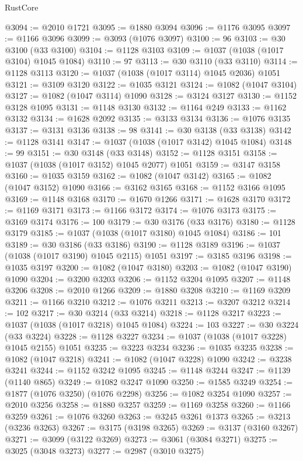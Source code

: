 \begin{lexlean}{RustCore}
\begin{coremodule}
@3094 := @2010 @1721
@3095 := @1880 @3094
@3096 := @1176 @3095
@3097 := @1166 @3096
@3099 := @3093 (@1076 @3097)
@3100 := 96
@3103 := @30 @3100 (@33 @3100)
@3104 := @1128 @3103
@3109 := @1037 (@1038 (@1017 @3104) @1045 @1084)
@3110 := 97
@3113 := @30 @3110 (@33 @3110)
@3114 := @1128 @3113
@3120 := @1037 (@1038 (@1017 @3114) @1045 @2036) @1051
@3121 := @3109 @3120
@3122 := @1035 @3121
@3124 := @1082 (@1047 @3104)
@3127 := @1082 (@1047 @3114) @1090
@3128 := @3124 @3127
@3130 := @1152 @3128 @1095
@3131 := @1148 @3130
@3132 := @1164 @249
@3133 := @1162 @3132
@3134 := @1628 @2092
@3135 := @3133 @3134
@3136 := @1076 @3135
@3137 := @3131 @3136
@3138 := 98
@3141 := @30 @3138 (@33 @3138)
@3142 := @1128 @3141
@3147 := @1037 (@1038 (@1017 @3142) @1045 @1084)
@3148 := 99
@3151 := @30 @3148 (@33 @3148)
@3152 := @1128 @3151
@3158 := @1037 (@1038 (@1017 @3152) @1045 @2077) @1051
@3159 := @3147 @3158
@3160 := @1035 @3159
@3162 := @1082 (@1047 @3142)
@3165 := @1082 (@1047 @3152) @1090
@3166 := @3162 @3165
@3168 := @1152 @3166 @1095
@3169 := @1148 @3168
@3170 := @1670 @1266
@3171 := @1628 @3170
@3172 := @1169 @3171
@3173 := @1166 @3172
@3174 := @1076 @3173
@3175 := @3169 @3174
@3176 := 100
@3179 := @30 @3176 (@33 @3176)
@3180 := @1128 @3179
@3185 := @1037 (@1038 (@1017 @3180) @1045 @1084)
@3186 := 101
@3189 := @30 @3186 (@33 @3186)
@3190 := @1128 @3189
@3196 := @1037 (@1038 (@1017 @3190) @1045 @2115) @1051
@3197 := @3185 @3196
@3198 := @1035 @3197
@3200 := @1082 (@1047 @3180)
@3203 := @1082 (@1047 @3190) @1090
@3204 := @3200 @3203
@3206 := @1152 @3204 @1095
@3207 := @1148 @3206
@3208 := @2010 @1266
@3209 := @1880 @3208
@3210 := @1169 @3209
@3211 := @1166 @3210
@3212 := @1076 @3211
@3213 := @3207 @3212
@3214 := 102
@3217 := @30 @3214 (@33 @3214)
@3218 := @1128 @3217
@3223 := @1037 (@1038 (@1017 @3218) @1045 @1084)
@3224 := 103
@3227 := @30 @3224 (@33 @3224)
@3228 := @1128 @3227
@3234 := @1037 (@1038 (@1017 @3228) @1045 @2155) @1051
@3235 := @3223 @3234
@3236 := @1035 @3235
@3238 := @1082 (@1047 @3218)
@3241 := @1082 (@1047 @3228) @1090
@3242 := @3238 @3241
@3244 := @1152 @3242 @1095
@3245 := @1148 @3244
@3247 := @1139 (@1140 @865)
@3249 := @1082 @3247 @1090
@3250 := @1585 @3249
@3254 := @1877 (@1076 @3250) (@1076 @2298)
@3256 := @1082 @3254 @1090
@3257 := @2010 @3256
@3258 := @1880 @3257
@3259 := @1169 @3258
@3260 := @1166 @3259
@3261 := @1076 @3260
@3263 := @3245 @3261 @1373
@3265 := @3213 (@3236 @3263)
@3267 := @3175 (@3198 @3265)
@3269 := @3137 (@3160 @3267)
@3271 := @3099 (@3122 @3269)
@3273 := @3061 (@3084 @3271)
@3275 := @3025 (@3048 @3273)
@3277 := @2987 (@3010 @3275)

\end{coremodule}
\end{lexlean}
